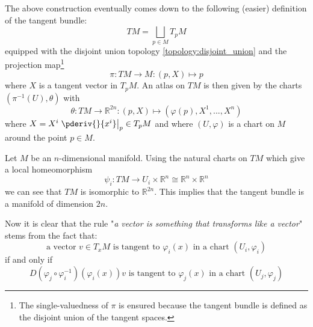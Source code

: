 	\begin{adefinition}
		The above construction eventually comes down to the following (easier) definition of the tangent bundle:
		\begin{equation}
			TM = \bigsqcup_{p\in M}T_pM
		\end{equation}
		equipped with the disjoint union topology \ref{topology:disjoint_union} and the projection map\footnote{The single-valuedness of $\pi$ is ensured because the tangent bundle is defined as the disjoint union of the tangent spaces.}
		\begin{equation}
			\pi:TM\rightarrow M:(p, X)\mapsto p
		\end{equation}
		where $X$ is a tangent vector in $T_pM$. An atlas on $TM$ is then given by the charts $(\pi^{-1}(U), \theta)$ with
		\begin{equation}
			\theta:TM\rightarrow\mathbb{R}^{2n}:(p, X)\mapsto(\varphi(p), X^1, ..., X^n)
		\end{equation}
		where $X = X^i\left.\pderiv{}{x^i}\right|_p\in T_pM$ and where $(U, \varphi)$ is a chart on $M$ around the point $p\in M$.
	\end{adefinition}
	
	\begin{property}
		Let $M$ be an $n$-dimensional manifold. Using the natural charts on $TM$ which give a local homeomorphism \[\psi_i:TM\rightarrow U_i\times\mathbb{R}^n\cong\mathbb{R}^n\times\mathbb{R}^n\] we can see that $TM$ is isomorphic to $\mathbb{R}^{2n}$. This implies that the tangent bundle is a manifold of dimension $2n$.
	\end{property}
	
	\begin{remark}
		Now it is clear that the rule "\textit{a vector is something that transforms like a vector}" stems from the fact that:
		\[\text{a vector }v\in T_xM\text{ is tangent to }\varphi_i(x)\text{ in a chart }(U_i, \varphi_i)\]
		if and only if
		\[D(\varphi_j\circ\varphi_i^{-1})(\varphi_i(x))v\text{ is tangent to }\varphi_j(x)\text{ in a chart }(U_j, \varphi_j)\]
	\end{remark}
	
